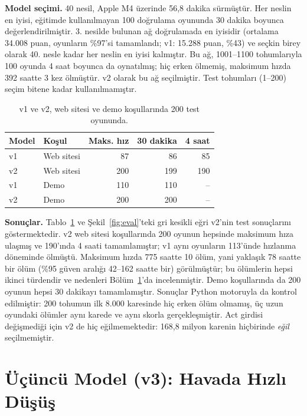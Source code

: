 \documentclass[11pt,a4paper]{article}
\begin{document}
\textbf{Model seçimi.} 40 nesil, Apple M4 üzerinde 56,8 dakika sürmüştür. Her neslin en iyisi, eğitimde kullanılmayan 100 doğrulama oyununda 30 dakika boyunca değerlendirilmiştir. 3. nesilde bulunan ağ doğrulamada en iyisidir (ortalama 34.008 puan, oyunların \%97'si tamamlandı; v1: 15.288 puan, \%43) ve seçkin birey olarak 40. nesle kadar her neslin en iyisi kalmıştır. Bu ağ, 1001--1100 tohumlarıyla 100 oyunda 4 saat boyunca da oynatılmış; hiç erken ölmemiş, maksimum hızda 392 saatte 3 kez ölmüştür. v2 olarak bu ağ seçilmiştir. Test tohumları (1--200) seçim bitene kadar kullanılmamıştır.

\begin{table}[!htbp]
  \centering
  \small
  \caption{v1 ve v2, web sitesi ve demo koşullarında 200 test oyununda.}
  \label{tab:v2}
  \begin{tabular}{@{}l l r r r@{}}
    \toprule
    Model & Koşul & Maks. hız & 30 dakika & 4 saat \\
    \midrule
    v1 & Web sitesi & 87 & 86 & 85 \\
    v2 & Web sitesi & 200 & 199 & 190 \\
    v1 & Demo & 110 & 110 & -- \\
    v2 & Demo & 200 & 200 & -- \\
    \bottomrule
  \end{tabular}
\end{table}
\FloatBarrier

\textbf{Sonuçlar.} Tablo~\ref{tab:v2} ve Şekil~\ref{fig:eval}'teki gri kesikli eğri v2'nin test sonuçlarını göstermektedir. v2 web sitesi koşullarında 200 oyunun hepsinde maksimum hıza ulaşmış ve 190'ında 4 saati tamamlamıştır; v1 aynı oyunların 113'ünde hızlanma döneminde ölmüştü. Maksimum hızda 775 saatte 10 ölüm, yani yaklaşık 78 saatte bir ölüm (\%95 güven aralığı 42--162 saatte bir) görülmüştür; bu ölümlerin hepsi ikinci türdendir ve nedenleri Bölüm~\ref{sec:v3}'da incelenmiştir. Demo koşullarında da 200 oyunun hepsi 30 dakikayı tamamlamıştır. Sonuçlar Python motoruyla da kontrol edilmiştir: 200 tohumun ilk 8.000 karesinde hiç erken ölüm olmamış, üç uzun oyundaki ölümler aynı karede ve aynı skorla gerçekleşmiştir. Act girdisi değişmediği için v2 de hiç eğilmemektedir: 168,8 milyon karenin hiçbirinde \emph{eğil} seçilmemiştir.

\section{Üçüncü Model (v3): Havada Hızlı Düşüş}
\label{sec:v3}
\end{document}
